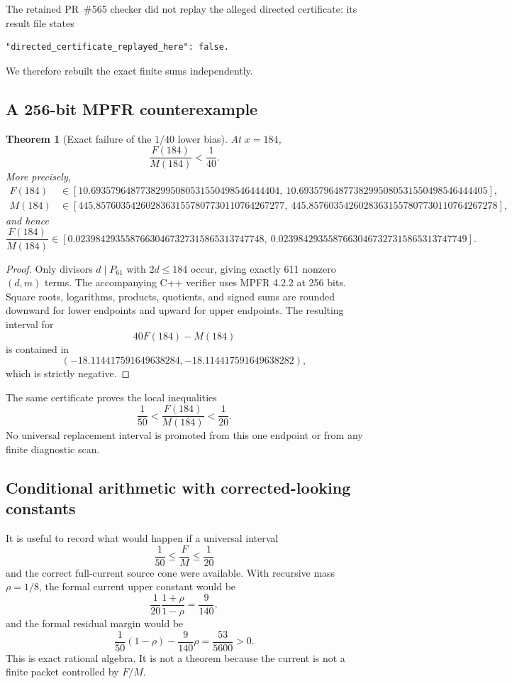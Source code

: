 \documentclass[11pt]{article}
\newtheorem{theorem}{Theorem}[section]
\newcommand{\Psmall}{P_{61}}
\begin{document}
The retained PR~\#565 checker did not replay the alleged directed certificate: its result file states
\begin{lstlisting}[basicstyle=\ttfamily\small]
"directed_certificate_replayed_here": false.
\end{lstlisting}
We therefore rebuilt the exact finite sums independently.

\subsection{A 256-bit MPFR counterexample}
\begin{theorem}[Exact failure of the $1/40$ lower bias]\label{thm:bias-false}
At $x=184$,
\[
 \frac{F(184)}{M(184)}<\frac1{40}.
\]
More precisely,
\begin{align*}
 F(184)&\in[10.69357964877382995080531550498546444404,\
              10.69357964877382995080531550498546444405],\\
 M(184)&\in[445.85760354260283631557807730110764267277,\
              445.85760354260283631557807730110764267278],
\end{align*}
and hence
\[
 \frac{F(184)}{M(184)}
 \in[0.02398429355876630467327315865313747748,\
      0.02398429355876630467327315865313747749].
\]
\end{theorem}

\begin{proof}
Only divisors $d\mid\Psmall$ with $2d\le184$ occur, giving exactly 611 nonzero $(d,m)$ terms.  The accompanying C++ verifier uses MPFR 4.2.2 at 256 bits.  Square roots, logarithms, products, quotients, and signed sums are rounded downward for lower endpoints and upward for upper endpoints.  The resulting interval for
\[
 40F(184)-M(184)
\]
is contained in
\[
 (-18.114417591649638284,-18.114417591649638282),
\]
which is strictly negative.
\end{proof}

The same certificate proves the local inequalities
\[
 \frac1{50}<\frac{F(184)}{M(184)}<\frac1{20}.
\]
No universal replacement interval is promoted from this one endpoint or from any finite diagnostic scan.

\subsection{Conditional arithmetic with corrected-looking constants}
It is useful to record what would happen if a universal interval
\[
 \frac1{50}\le\frac FM\le\frac1{20}
\]
and the correct full-current source cone were available.  With recursive mass $\rho=1/8$, the formal current upper constant would be
\[
 \frac1{20}\frac{1+\rho}{1-\rho}=\frac9{140},
\]
and the formal residual margin would be
\[
 \frac1{50}(1-\rho)-\frac9{140}\rho=\frac{53}{5600}>0.
\]
This is exact rational algebra.  It is not a theorem because the current is not a finite packet controlled by $F/M$.
\end{document}
